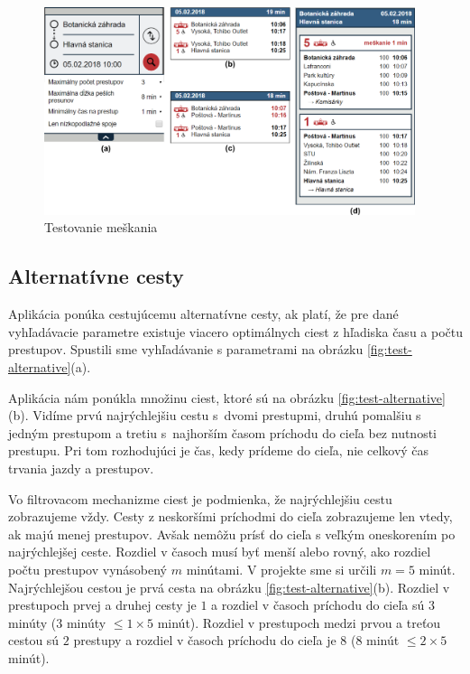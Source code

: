 \begin{figure}[H]
\centerline{\includegraphics[width=0.97\textwidth]{images/test/delay}}
\caption[Testovanie meškania]{Testovanie meškania}
\label{fig:test-delay}
\end{figure}

\subsection{Alternatívne cesty}
Aplikácia ponúka cestujúcemu alternatívne cesty, ak platí, že pre dané vyhľadávacie parametre existuje viacero optimálnych ciest z hľadiska času a počtu prestupov. Spustili sme vyhľadávanie s parametrami na obrázku \ref{fig:test-alternative}(a). 

Aplikácia nám ponúkla množinu ciest, ktoré sú na obrázku \ref{fig:test-alternative}(b). Vidíme prvú najrýchlejšiu cestu s~dvomi prestupmi, druhú pomalšiu s jedným prestupom a tretiu s~najhorším časom príchodu do cieľa bez nutnosti prestupu. Pri tom rozhodujúci je čas, kedy prídeme do cieľa, nie celkový čas trvania jazdy a prestupov. 

Vo filtrovacom mechanizme ciest je podmienka, že najrýchlejšiu cestu zobrazujeme vždy. Cesty z neskoršími príchodmi do cieľa zobrazujeme len vtedy, ak majú menej prestupov. Avšak nemôžu prísť do cieľa s veľkým oneskorením po najrýchlejšej ceste. Rozdiel v časoch musí byť menší alebo rovný, ako rozdiel počtu prestupov vynásobený $m$ minútami. V projekte sme si určili $m = 5$ minút. Najrýchlejšou cestou je prvá cesta na obrázku \ref{fig:test-alternative}(b). Rozdiel v prestupoch prvej a druhej cesty je $1$ a rozdiel v časoch príchodu do cieľa sú $3$ minúty ($3$ minúty $\leq 1\times5$ minút).
Rozdiel v prestupoch medzi prvou a treťou cestou sú $2$ prestupy a rozdiel v časoch príchodu do cieľa je $8$ ($8$ minút $\leq 2\times5$ minút).

